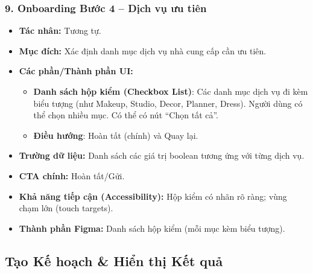 \documentclass[11pt,a4paper]{article}
\begin{document}
\subsubsection{9. Onboarding Bước 4 – Dịch vụ ưu tiên}
\begin{itemize}
    \item \textbf{Tác nhân:} Tương tự.
    \item \textbf{Mục đích:} Xác định danh mục dịch vụ nhà cung cấp cần ưu tiên.
    \item \textbf{Các phần/Thành phần UI:}
    \begin{itemize}
        \item \textbf{Danh sách hộp kiểm (Checkbox List)}: Các danh mục dịch vụ đi kèm biểu tượng (như Makeup, Studio, Decor, Planner, Dress). Người dùng có thể chọn nhiều mục. Có thể có nút ``Chọn tất cả''.
        \item \textbf{Điều hướng}: Hoàn tất (chính) và Quay lại.
    \end{itemize}
    \item \textbf{Trường dữ liệu:} Danh sách các giá trị boolean tương ứng với từng dịch vụ.
    \item \textbf{CTA chính:} Hoàn tất/Gửi.
    \item \textbf{Khả năng tiếp cận (Accessibility):} Hộp kiểm có nhãn rõ ràng; vùng chạm lớn (touch targets).
    \item \textbf{Thành phần Figma:} Danh sách hộp kiểm (mỗi mục kèm biểu tượng).
\end{itemize}

\subsection{Tạo Kế hoạch \& Hiển thị Kết quả}
\end{document}
